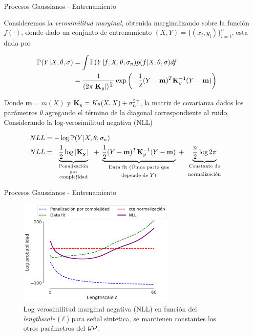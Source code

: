 \documentclass[handout, 9pt]{beamer}
\begin{document}
\begin{frame}{Procesos Gaussianos - Entrenamiento}

    Consideremos la \textit{verosimilitud marginal}, obtenida marginalizando sobre la función $f(\cdot)$, donde dado un conjunto de entrenamiento $(X, Y)= \{(x_i, y_i)\}_{i=1}^{n}$, esta dada por \pause

    \begin{align*}
        \mathbb{P}(Y|X, \theta, \sigma) & = \int \mathbb{P}(Y|f, X, \theta, \sigma_n) p(f|X,\theta, \sigma) df \\
        & = \frac{1}{\left( 2\pi |\mathbf{K}_y|\right)^{\frac{n}{2}}} 
        \exp \left(
        -\frac{1}{2} (Y - \mathbf{m})^T \mathbf{K}_y^{-1} (Y - \mathbf{m})
        \right)
    \end{align*} \pause 
    
    Donde $\mathbf{m}=m(X)$ y $\mathbf{K}_y=K_{\theta}(X,X) + \sigma_n^2 {\mathbb I}$, la matriz de covarianza dados los parámetros $\theta$ agregando el término de la diagonal correspondiente al ruido.\\ \pause 
    Considerando la log-verosimilitud negativa (NLL)

    \begin{align*}
        NLL & = -\log \pr(Y|X, \theta, \sigma_n) \\
        NLL & = \underbrace{ \color{black}{\frac{1}{2}\log|\mathbf{K_y}|} }_
            {\text{\parbox{2cm}{\centering Penalización\\[-4pt] por\\[-4pt] complejidad}}}
            + \underbrace{ \color{black}{\frac{1}{2}(Y - \mathbf{m})^T \mathbf{K}_y^{-1} (Y - \mathbf{m}) }}_
            {\text{\parbox{4cm}{\centering Data fit (Única parte que depende de $Y$)}}}
            + \underbrace{ \color{black}{\frac{n}{2} \log2\pi}}_
            {\text{\parbox{2cm}{\centering Constante de normalización}}}
    \end{align*}

    
\end{frame}

\begin{frame}{Procesos Gaussianos - Entrenamiento}
    \begin{figure}[H]
        \centering
        \includegraphics[width=0.7\textwidth]{../img/cap8_nll_partes}
        \caption{Log verosimilitud marginal negativa (NLL) en función del \textit{lengthscale} ($\ell$) para señal sintetica, se mantienen constantes los otros parámetros del $\mathcal{GP}$.}
    \end{figure}
\end{frame}
\end{document}
